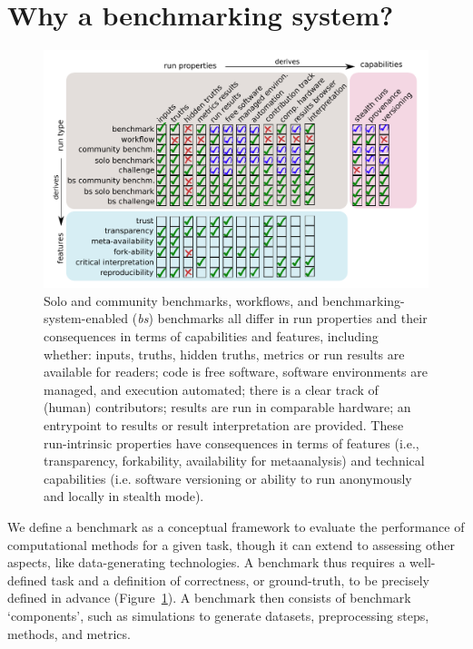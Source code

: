 \documentclass[11pt]{article}
\begin{document}
\section*{Why a benchmarking system?}


\begin{figure}
    \centering
    \includegraphics[width=\linewidth]{figures/fig_benchmarking.pdf}
    {\color{red} \caption[Run types, properties, capabilities and features.]{Solo and community benchmarks, workflows, and benchmarking-system-enabled (\textit{bs}) benchmarks all differ in run properties and their consequences in terms of capabilities and features, including whether: inputs, truths, hidden truths, metrics or run results are available for readers; code is free software, software environments are managed, and execution automated; there is a clear track of (human) contributors; results are run in comparable hardware; an entrypoint to results or result interpretation are provided. These run-intrinsic properties have consequences in terms of features (i.e., transparency, forkability, availability for metaanalysis) and technical capabilities (i.e. software versioning or ability to run anonymously and locally in stealth mode). \label{fig:definitions}}
    }
\end{figure}


We define a benchmark as a conceptual framework to evaluate the performance of computational methods for a given task, though it can extend to assessing other aspects, like data-generating technologies. A benchmark thus requires a well-defined task and a definition of correctness, or ground-truth, to be precisely defined in advance {\color{red} (Figure~\ref{fig:definitions})}. A benchmark then consists of benchmark `components', such as simulations to generate datasets, preprocessing steps, methods, and metrics. 
\end{document}
